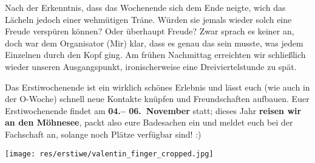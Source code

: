 \begin{multicols*}{2}
Nach der Erkenntnis, dass das Wochenende sich dem Ende neigte, wich das Lächeln jedoch einer wehmütigen Träne.
Würden sie jemals wieder solch eine Freude verspüren können?
Oder überhaupt Freude?
Zwar sprach es keiner an, doch war dem Organisator (Mir) klar, dass es genau das sein musste, was jedem Einzelnen durch den Kopf ging.
Am frühen Nachmittag erreichten wir schließlich wieder unseren Ausgangspunkt, ironischerweise eine Dreiviertelstunde zu spät. 

Das Erstiwochenende ist ein wirklich schönes Erlebnis und lässt euch (wie auch in der O-Woche) schnell neue Kontakte knüpfen und Freundschaften aufbauen.
Euer Erstiwochenende findet am \textbf{04.-- 06.~November} statt; dieses Jahr \textbf{reisen wir an den Möhnesee}, packt also eure Badesachen ein und meldet euch bei der Fachschaft an, solange noch Plätze verfügbar sind! :)

\vspace{12ex}
\begin{center}
	\texttt{[image: res/erstiwe/valentin\_finger\_cropped.jpg]}
\end{center}
\end{multicols*}
